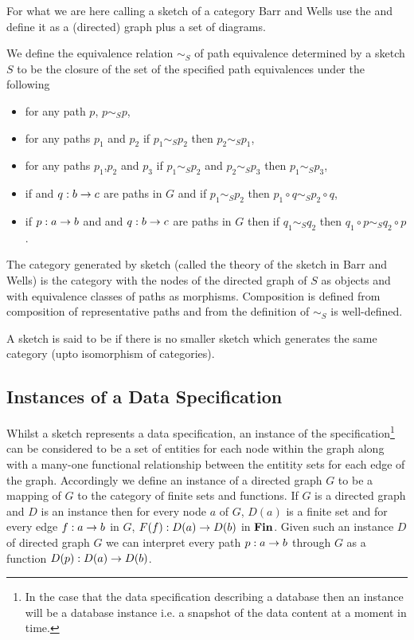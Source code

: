 For what we are here calling a sketch of a category Barr and Wells use the  and define it as a (directed) graph plus a set of diagrams.

We define the equivalence relation $\sim_S$ of path equivalence determined by a sketch $S$ to be the closure of the set of the specified path equivalences under the following

\begin{itemize}
\item for any path $p$, $p \sim_S p$,
\item for any paths $p_1$ and $p_2$ if $p_1 \sim_S p_2$ then $p_2 \sim_S p_1$,
\item for any paths $p_1$,$p_2$ and $p_3$ if $p_1 \sim_S p_2$ and $p_2 \sim_S p_3$ then $p_1 \sim_S p_3$,
\item if  and $q: b \rightarrow c$ are paths in $G$ and if $p_1 \sim_S p_2$  
then $p_1 \circ q \sim_S p_2 \circ q$,
\item if $p: a \rightarrow b$ and  and $q: b \rightarrow c$ are paths in $G$ then if $q_1 \sim_S q_2$  
then $q_1 \circ p \sim_S q_2 \circ p$.
\end{itemize}

The category generated by sketch (called the theory of the sketch in Barr and Wells) is the category with
the nodes of the directed graph of $S$ as objects and with equivalence classes of paths as morphisms.
Composition is defined from composition of representative paths and from the definition of $\sim_S$ is well-defined.

A sketch is said to be  
if there is no smaller sketch which generates the same category (upto isomorphism of categories).

\subsection{Instances of a Data Specification}
Whilst a sketch represents a data specification, an instance of the specification\footnote{In the case that the data specification describing a database then an instance will be a database instance i.e. a snapshot of the data content at a moment in time.} can be considered to be a set of entities for each node within the graph
along with a many-one functional relationship between the entitity sets for each edge of the graph. 
Accordingly we define an instance of a directed graph $G$ to be a mapping of $G$ to the category of finite sets and functions.
If $G$ is a directed graph and $D$ is an instance then for every node $a$ of $G$, $D(a)$ is a finite set
and for every edge $f:a \rightarrow b$ in $G$, $F(f):D(a) \rightarrow D(b)$ in $\textbf{Fin}$. Given such an instance $D$ of 
directed graph $G$ 
we can interpret every path $p:a \rightarrow b$ through $G$ as a function $D(p): D(a) \rightarrow D(b)$.

